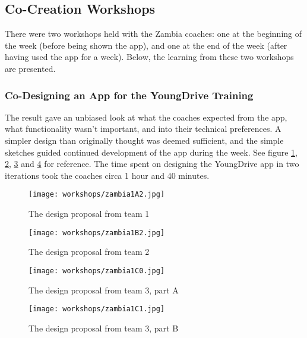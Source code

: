 \subsection{Co-Creation Workshops}

There were two workshops held with the Zambia coaches: one at the beginning of the week (before being shown the app), and one at the end of the week (after having used the app for a week). Below, the learning from these two workshops are presented.

\subsubsection{Co-Designing an App for the YoungDrive Training}

    The result gave an unbiased look at what the coaches expected from the app, what functionality wasn't important, and into their technical preferences. A simpler design than originally thought was deemed sufficient, and the simple sketches guided continued development of the app during the week. See figure \ref{fig:zambia1A2}, \ref{fig:zambia1B2}, \ref{fig:zambia1C0} and \ref{fig:zambia1C1} for reference. The time spent on designing the YoungDrive app in two iterations took the coaches circa 1 hour and 40 minutes.

    \begin{figure}[h]
        \centering
        \texttt{[image: workshops/zambia1A2.jpg]}
        \caption{The design proposal from team 1}
        \label{fig:zambia1A2}
    \end{figure}

    \begin{figure}[h]
        \centering
        \texttt{[image: workshops/zambia1B2.jpg]}
        \caption{The design proposal from team 2}
        \label{fig:zambia1B2}
    \end{figure}

    \begin{figure}[h]
        \centering
        \texttt{[image: workshops/zambia1C0.jpg]}
        \caption{The design proposal from team 3, part A}
        \label{fig:zambia1C0}
    \end{figure}

    \begin{figure}[h]
        \centering
        \texttt{[image: workshops/zambia1C1.jpg]}
        \caption{The design proposal from team 3, part B}
        \label{fig:zambia1C1}
    \end{figure}

